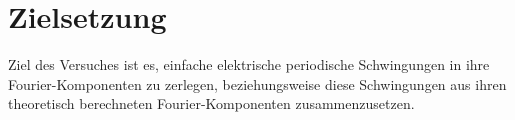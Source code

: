 
\section{Zielsetzung}
\label{sec:Zielsetzung}

Ziel des Versuches ist es, einfache elektrische periodische Schwingungen in ihre Fourier-Komponenten zu zerlegen, beziehungsweise diese Schwingungen aus ihren theoretisch berechneten Fourier-Komponenten zusammenzusetzen. 